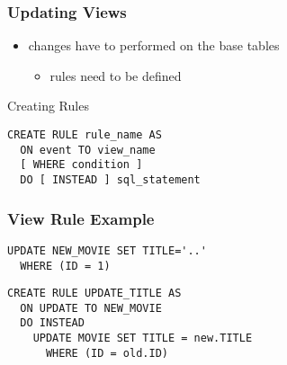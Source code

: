 \documentclass[dvipsnames]{beamer}
\theoremstyle{plain}
\begin{document}
\begin{frame}[fragile]
  \frametitle{Updating Views}

  \begin{itemize}
    \item changes have to performed on the base tables
    \begin{itemize}
      \item rules need to be defined
    \end{itemize}
  \end{itemize}

  \pause
  \begin{block}{Creating Rules}
    \begin{lstlisting}[language=ExtendedSQL]
CREATE RULE rule_name AS
  ON event TO view_name
  [ WHERE condition ]
  DO [ INSTEAD ] sql_statement
    \end{lstlisting}
  \end{block}
\end{frame}

\begin{frame}[fragile]
  \frametitle{View Rule Example}

  \begin{example}
    \begin{lstlisting}[language=ExtendedSQL]
UPDATE NEW_MOVIE SET TITLE='..'
  WHERE (ID = 1)
    \end{lstlisting}

    \pause
    \begin{lstlisting}[language=ExtendedSQL]
CREATE RULE UPDATE_TITLE AS
  ON UPDATE TO NEW_MOVIE
  DO INSTEAD
    UPDATE MOVIE SET TITLE = new.TITLE
      WHERE (ID = old.ID)
    \end{lstlisting}
  \end{example}
\end{frame}

%
%
%
%
\end{document}
